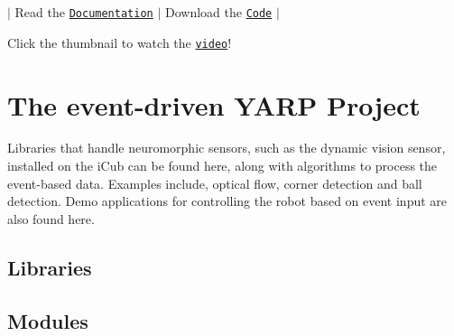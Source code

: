 $\vert$ Read the \href{http://robotology.github.io/event-driven/doxygen/doc/html/index.html}{\tt Documentation} $\vert$ Download the \href{https://github.com/robotology-playground/event-driven}{\tt Code} $\vert$

\href{https://youtu.be/xS-7xYRYSLc}{\tt }  Click the thumbnail to watch the \href{https://youtu.be/xS-7xYRYSLc}{\tt video}!

\section*{The event-\/driven Y\+A\+RP Project}

Libraries that handle neuromorphic sensors, such as the dynamic vision sensor, installed on the i\+Cub can be found here, along with algorithms to process the event-\/based data. Examples include, optical flow, corner detection and ball detection. Demo applications for controlling the robot based on event input are also found here.

\subsection*{Libraries}

\subsection*{Modules}


